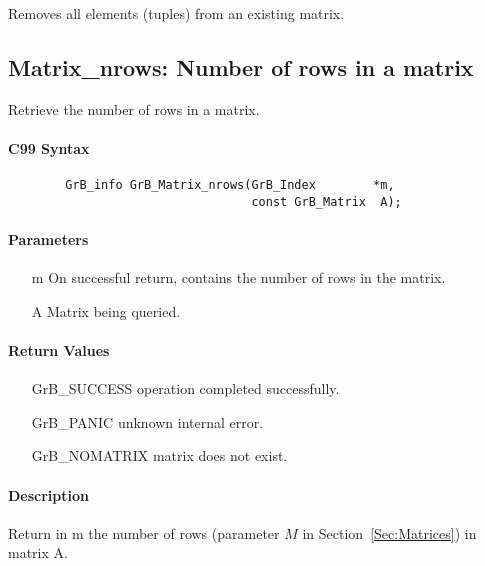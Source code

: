 Removes all elements (tuples) from an existing matrix.

\subsection{{\sf Matrix\_nrows}: Number of rows in a matrix}

Retrieve the number of rows in a matrix.

\paragraph{C99 Syntax}

\begin{verbatim}
        GrB_info GrB_Matrix_nrows(GrB_Index        *m,
                                  const GrB_Matrix  A);
\end{verbatim}

\paragraph{Parameters}

\begin{itemize}[leftmargin=1.1in]
    \item[{\sf m}] On successful return, contains the number of rows in the matrix.
    \item[{\sf A}] Matrix being queried.
\end{itemize}


\paragraph{Return Values}

\begin{itemize}[leftmargin=2.1in]
\item[{\sf GrB\_SUCCESS}]   operation completed successfully.
\item[{\sf GrB\_PANIC}]     unknown internal error.
\item[{\sf GrB\_NOMATRIX}]  matrix does not exist.
\end{itemize}

\paragraph{Description}

Return in {\sf m} the number of rows (parameter $M$ in Section~\ref{Sec:Matrices}) in matrix {\sf A}.

